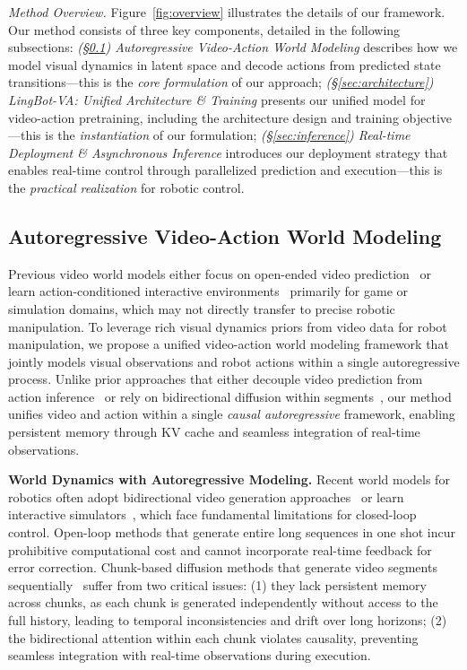 \documentclass[onecolumn]{robbyant}           %
\newcommand\methodname{LingBot-VA}
\begin{document}
\noindent\textit{Method Overview.}
Figure~\ref{fig:overview} illustrates the details of our framework.
Our method consists of three key components, detailed in the following subsections:
\textit{(\S\ref{sec:world_model}) Autoregressive Video-Action World Modeling} describes how we
model visual dynamics in latent space and decode actions from predicted state transitions---this is the \emph{core formulation} of our approach;
\textit{(\S\ref{sec:architecture}) \methodname: Unified Architecture \& Training} presents our unified model
for video-action pretraining, including the architecture design and training objective---this is the \emph{instantiation} of our formulation;
\textit{(\S\ref{sec:inference}) Real-time Deployment \& Asynchronous Inference} introduces our deployment
strategy that enables real-time control through parallelized prediction and execution---this is the \emph{practical realization} for robotic control. 

\subsection{Autoregressive Video-Action World Modeling}
\label{sec:world_model}

Previous video world models either focus on open-ended video prediction~\cite{sora} or learn action-conditioned interactive environments~\cite{genie,genie2} primarily for game or simulation domains, which may not directly transfer to precise robotic manipulation.
To leverage rich visual dynamics priors from video data for robot manipulation, we propose a unified video-action world modeling framework that jointly models visual observations and robot actions within a single autoregressive process.
Unlike prior approaches that either decouple video prediction from action inference~\cite{moto,vpp} or rely on bidirectional diffusion within segments~\cite{uwm}, our method unifies video and action within a single \emph{causal autoregressive} framework, enabling persistent memory through KV cache and seamless integration of real-time observations.



\noindent\textbf{World Dynamics with Autoregressive Modeling.}
Recent world models for robotics often adopt bidirectional video generation approaches~\cite{unipi,dreamitate,gen2act,pwa} or learn interactive simulators~\cite{unisim}, which face fundamental limitations for closed-loop control.
Open-loop methods that generate entire long sequences in one shot incur prohibitive computational cost
and cannot incorporate real-time feedback for error correction.
Chunk-based diffusion methods that generate video segments sequentially~\cite{vidar,uwm} suffer from two critical issues:
(1) they lack persistent memory across chunks, as each chunk is generated independently without access to the full history, leading to temporal inconsistencies and drift over long horizons;
(2) the bidirectional attention within each chunk violates causality, preventing seamless integration with real-time observations during execution.
\end{document}
